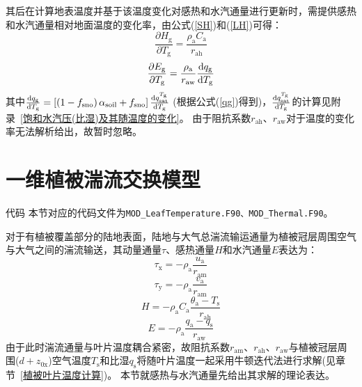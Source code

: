 其后在计算地表温度并基于该温度变化对感热和水汽通量进行更新时，需提供感热和水汽通量相对地面温度的变化率，由公式(\ref{SH})和(\ref{LH})可得：
\begin{equation}
  \frac{\partial H_{\mathrm{g}}}{\partial T_{\mathrm{g}}}=\frac{\rho_{\mathrm{a}} C_{\mathrm{a}}}{r_{\mathrm{a h}}}
\end{equation}
\begin{equation}\label{Eg/Tg_1}
  \frac{\partial E_{\mathrm{g}}}{\partial T_{\mathrm{g}}}= \frac{\rho_{\mathrm{a}}}{r_{\mathrm{a w}}} \frac{{\rm d} q_{\mathrm{g}}}{{\rm d} T_{\mathrm{g}}}
\end{equation}
其中$\frac{{\rm d}q_{\mathrm {g}}}{{\rm d}T_{\mathrm {g}}}=\left[\left(1-f_{\mathrm{sno}}\right)\alpha_{\mathrm{soil}}+f_{\mathrm{sno}}\right]\frac{{\rm d}q_{\mathrm{sat}}^{T_{\mathrm {g}}}}{{\rm d}T_{\mathrm {g}}}$ (根据公式(\ref{qg})得到)，$\frac{{\rm d}q_{\mathrm{sat}}^{T_{\mathrm {g}}}}{{\rm d}T_{\mathrm {g}}}$的计算见附录~\ref{饱和水汽压(比湿)及其随温度的变化}。
由于阻抗系数$r_{\mathrm{ah}}$、$r_{\mathrm{aw}}$对于温度的变化率无法解析给出，故暂时忽略。


\section{一维植被湍流交换模型}\label{一维植被湍流交换模型}
\begin{mymdframed}{代码}
  本节对应的代码文件为\texttt{MOD\_LeafTemperature.F90、MOD\_Thermal.F90}。
\end{mymdframed}

对于有植被覆盖部分的陆地表面，陆地与大气总湍流输运通量为植被冠层周围空气与大气之间的湍流输送，其动量通量$\tau$、感热通量$H$和水汽通量$E$表达为：
\begin{equation}
  \tau_{\mathrm{x}}=-\rho_{\mathrm{a}} \frac{u_{\mathrm{a}}}{r_{\mathrm{a m}}}
\end{equation}
\begin{equation}
  \tau_{\mathrm{y}}=-\rho_{\mathrm{a}} \frac{v_{\mathrm{a}}}{r_{\mathrm{a m}}}
\end{equation}
\begin{equation}
  H=-\rho_{\mathrm{a}} C_{\mathrm{a}} \frac{\theta_{\mathrm{a}}-T_{\mathrm{s}}}{r_{\mathrm{a h}}}
\end{equation}
\begin{equation}
  E=-\rho_{\mathrm{a}} \frac{q_{\mathrm{a}}-q_{\mathrm{s}}}{r_{\mathrm{a w}}}
\end{equation}
由于此时湍流通量与叶片温度耦合紧密，故阻抗系数$r_{\mathrm{am}}$、$r_{\mathrm{ah}}$、$r_{\mathrm{aw}}$与植被冠层周围($d+z_{\mathrm{0x}}$)空气温度$T_{\mathrm {s}}$和比湿$q_{\mathrm {s}}$将随叶片温度一起采用牛顿迭代法进行求解(见章节~\ref{植被叶片温度计算})。
本节就感热与水汽通量先给出其求解的理论表达。


